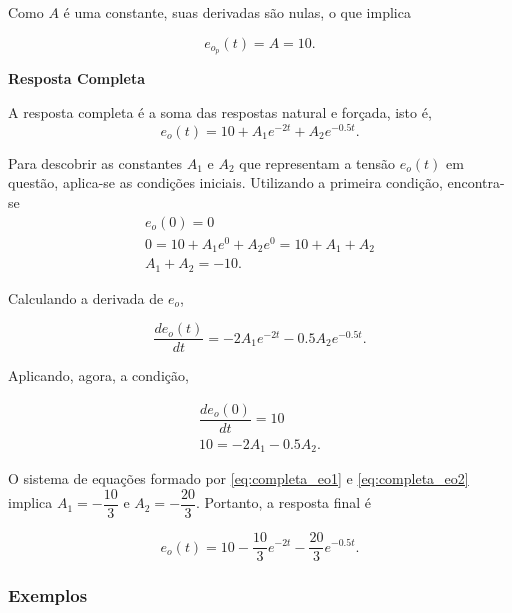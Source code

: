 \documentclass{article}
\numberwithin{equation}{section}
\let\dfr\dfrac
\begin{document}
\noindent Como $A$ é uma constante, suas derivadas são nulas, o que implica

\begin{equation}
    e_{o_p}(t) = A = 10.
\end{equation}

\vspace{2mm}

\begin{center}{\textbf{Resposta Completa}}\end{center}
\noindent A resposta completa é a soma das respostas natural e forçada, isto é,
\begin{equation*}
    e_{o}(t) = 10 + A_{1}e^{-2t}+A_{2}e^{-0.5t}.
\end{equation*}

\noindent Para descobrir as constantes $A_{1}$ e $A_{2}$ que representam a tensão $e_{o}(t)$ em questão, aplica-se as condições iniciais. Utilizando a primeira condição, encontra-se
\begin{gather}
    e_{o}(0) = 0 \nonumber \\
    0 = 10 + A_{1}e^{0}+A_{2}e^{0} = 10 + A_{1} + A_{2} \nonumber \\
    A_{1} + A_{2} = -10. \label{eq:completa_eo1}
\end{gather}

\noindent Calculando a derivada de $e_o$,

\begin{equation*}
    \frac{de_{o}(t)}{dt} = -2A_{1}e^{-2t}-0.5A_{2}e^{-0.5t}.
\end{equation*}

\noindent Aplicando, agora, a condição,

\begin{gather}
    \dfr{de_o(0)}{dt} = 10 \nonumber
    \\
    10 = -2A_1 - 0.5A_2. \label{eq:completa_eo2}
\end{gather}

\noindent O sistema de equações formado por \eqref{eq:completa_eo1} e \eqref{eq:completa_eo2} implica $A_{1}  = -\dfr{10}{3} $ e $A_{2} = -\dfr{20}{3}$. Portanto, a resposta final é

\begin{equation}
    e_o(t) = 10 - \frac{10}{3}e^{-2t} - \frac{20}{3}e^{-0.5t}.
\end{equation}

\subsubsection{Exemplos}
\label{subsubsec:exemplosreativos}
\end{document}
